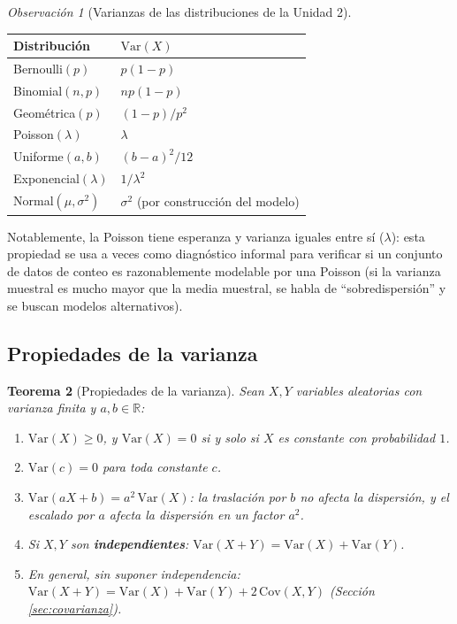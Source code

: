 \documentclass[11pt,a4paper]{article}
\theoremstyle{plain}
\newtheorem{teorema}{Teorema}[section]
\theoremstyle{definition}
\theoremstyle{remark}
\newtheorem{observacion}[teorema]{Observación}
\begin{document}
\begin{observacion}[Varianzas de las distribuciones de la Unidad 2]
\begin{center}
\begin{tabular}{@{}ll@{}}
\toprule
Distribución & $\text{Var}(X)$ \\
\midrule
Bernoulli$(p)$ & $p(1-p)$ \\
Binomial$(n,p)$ & $np(1-p)$ \\
Geométrica$(p)$ & $(1-p)/p^2$ \\
Poisson$(\lambda)$ & $\lambda$ \\
Uniforme$(a,b)$ & $(b-a)^2/12$ \\
Exponencial$(\lambda)$ & $1/\lambda^2$ \\
Normal$(\mu,\sigma^2)$ & $\sigma^2$ (por construcción del modelo) \\
\bottomrule
\end{tabular}
\end{center}
Notablemente, la Poisson tiene esperanza y varianza iguales entre sí ($\lambda$): esta propiedad se usa a veces como diagnóstico informal para verificar si un conjunto de datos de conteo es razonablemente modelable por una Poisson (si la varianza muestral es mucho mayor que la media muestral, se habla de ``sobredispersión'' y se buscan modelos alternativos).
\end{observacion}

\subsection{Propiedades de la varianza}

\begin{teorema}[Propiedades de la varianza]
Sean $X,Y$ variables aleatorias con varianza finita y $a,b\in\mathbb{R}$:
\begin{enumerate}[label=(\roman*)]
\item $\text{Var}(X)\geq 0$, y $\text{Var}(X)=0$ si y solo si $X$ es constante con probabilidad $1$.
\item $\text{Var}(c)=0$ para toda constante $c$.
\item $\text{Var}(aX+b) = a^2\,\text{Var}(X)$: la traslación por $b$ no afecta la dispersión, y el escalado por $a$ afecta la dispersión en un factor $a^2$.
\item Si $X,Y$ son \textbf{independientes}: $\text{Var}(X+Y)=\text{Var}(X)+\text{Var}(Y)$.
\item En general, sin suponer independencia: $\text{Var}(X+Y) = \text{Var}(X)+\text{Var}(Y)+2\,\text{Cov}(X,Y)$ (Sección \ref{sec:covarianza}).
\end{enumerate}
\end{teorema}
\end{document}
